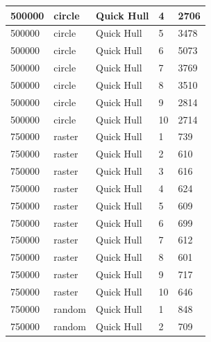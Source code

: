 \documentclass[12pt]{article}
\begin{document}
\begin{longtable}{|l|l|l|l|l|}
500000       & circle            & Quick Hull & 4          & 2706                          \\ \hline
500000       & circle            & Quick Hull & 5          & 3478                          \\ \hline
500000       & circle            & Quick Hull & 6          & 5073                          \\ \hline
500000       & circle            & Quick Hull & 7          & 3769                          \\ \hline
500000       & circle            & Quick Hull & 8          & 3510                          \\ \hline
500000       & circle            & Quick Hull & 9          & 2814                          \\ \hline
500000       & circle            & Quick Hull & 10         & 2714                          \\ \hline
750000       & raster            & Quick Hull & 1          & 739                           \\ \hline
750000       & raster            & Quick Hull & 2          & 610                           \\ \hline
750000       & raster            & Quick Hull & 3          & 616                           \\ \hline
750000       & raster            & Quick Hull & 4          & 624                           \\ \hline
750000       & raster            & Quick Hull & 5          & 609                           \\ \hline
750000       & raster            & Quick Hull & 6          & 699                           \\ \hline
750000       & raster            & Quick Hull & 7          & 612                           \\ \hline
750000       & raster            & Quick Hull & 8          & 601                           \\ \hline
750000       & raster            & Quick Hull & 9          & 717                           \\ \hline
750000       & raster            & Quick Hull & 10         & 646                           \\ \hline
750000       & random            & Quick Hull & 1          & 848                           \\ \hline
750000       & random            & Quick Hull & 2          & 709                           \\ \hline

\end{longtable}
\end{document}

